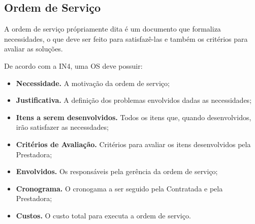 \subsection{Ordem de Serviço}

A ordem de serviço própriamente dita é um documento que formaliza necessidades,
o que deve ser feito para satisfazê-las e também os critérios para avaliar as
soluções.

De acordo com a IN4, uma OS deve possuir:

\begin{itemize}
  \item \textbf{Necessidade.} A motivação da ordem de serviço;
  \item \textbf{Justificativa.} A definição dos problemas envolvidos dadas as
  necessidades;
  \item \textbf{Itens a serem desenvolvidos.} Todos os itens que, quando
  desenvolvidos, irão satisfazer as necessdades;
  \item \textbf{Critérios de Avaliação.} Critérios para avaliar os itens
  desenvolvidos pela Prestadora;
  \item \textbf{Envolvidos.} Os responsáveis pela gerência da ordem de serviço;
  \item \textbf{Cronograma.} O cronogama a ser seguido pela Contratada e pela
  Prestadora;
  \item \textbf{Custos.} O custo total para executa a ordem de serviço.
\end{itemize}
